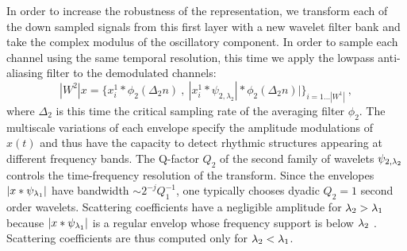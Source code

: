 In order to increase the robustness of the representation, we transform each of the down sampled signals from this first layer
with a new wavelet filter bank and take the complex modulus of the oscillatory component. 
In order to sample each channel using the same temporal resolution, this time we apply the lowpass anti-aliasing filter to the demodulated channels:
\begin{equation}
\label{scatnonjoint}
|W^2| x = \{ x^1_i \ast \phi_{2}  (\Delta_2 n)~,~| x^1_i \ast \psi_{2,\lambda_2} | \ast \phi_{2}(\Delta_2 n)| \}_{i=1\dots |W^1|}~,
\end{equation}
where $\Delta_2$ is this time the critical sampling rate of the averaging filter $\phi_2$. 
The multiscale variations of each envelope specify the amplitude modulations of $x(t)$ \cite{deepscatt} and  thus have the capacity to detect rhythmic structures appearing at different frequency bands. The Q-factor $Q_2$ of the second family of wavelets $\psi_{2,{\lambda}_2}$ 
controls the time-frequency resolution of the transform. 
Since the envelopes $| x \ast \psi_{{\lambda}_1}|$ have bandwidth $\sim 2^{-j} Q_1^{-1}$, 
one typically chooses dyadic $Q_2=1$ second order wavelets.
Scattering coefficients have a negligible amplitude for
${\lambda}_2 > {\lambda}_1$ because $|x \ast \psi_{{\lambda}_1}|$ is a regular envelop
whose frequency support is below ${\lambda}_2$ \cite{pami}. 
Scattering coefficients are thus computed only for ${\lambda}_2 < {\lambda}_1$. 


